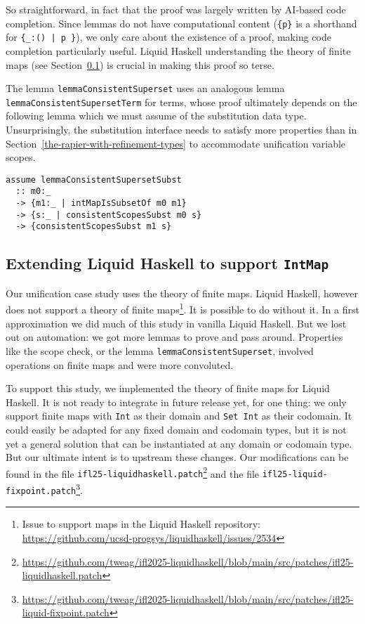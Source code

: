 \documentclass[sigconf]{acmart}
\newcommand{\tc}[1]{{\small\texttt{#1}}}
\newcommand{\patchfile}[1]{\tc{#1}\footnote{\scriptsize\url{https://github.com/tweag/ifl2025-liquidhaskell/blob/main/src/patches/#1}}}
\newtheorem{principle}{Principle}
\begin{document}
So straightforward, in fact that the proof was largely written by AI-based code
completion. Since lemmas do not have computational content (\tc{\{p\}} is a
shorthand for \tc{\{\_:() | p \}}), we only care about the existence of a
proof, making code completion particularly useful. Liquid Haskell understanding
the theory of finite maps (see Section~\ref{extending-liquid-haskell}) is crucial in
making this proof so terse.

The lemma \tc{lemmaConsistentSuperset} uses an analogous lemma \tc{lemma\-Consistent\-Superset\-Term} for terms,
whose proof ultimately depends on the following lemma which we must assume of the substitution data type.
Unsurprisingly, the substitution interface needs to satisfy more properties
than in Section~\ref{the-rapier-with-refinement-types} to accommodate
unification variable scopes.

\begin{verbatim}
assume lemmaConsistentSupersetSubst
  :: m0:_
  -> {m1:_ | intMapIsSubsetOf m0 m1}
  -> {s:_ | consistentScopesSubst m0 s}
  -> {consistentScopesSubst m1 s}
\end{verbatim}

\subsection{Extending Liquid Haskell to support \tc{IntMap}}
\label{extending-liquid-haskell}

Our unification case study uses the theory of finite maps. Liquid Haskell,
however does not support a theory of finite maps\footnote{Issue to support maps in
  the Liquid Haskell repository:
  \url{https://github.com/ucsd-progsys/liquidhaskell/issues/2534}}. It is
possible to do without it. In a first approximation we did much of this study in
vanilla Liquid Haskell. But we lost out on automation: we got more lemmas to prove
and pass around. Properties like the scope check, or the lemma
\tc{lemmaConsistentSuperset}, involved operations on finite maps and were more
convoluted.



To support this study, we implemented the theory of finite maps for Liquid
Haskell. It is not ready to integrate in future release yet, for one thing: we only support finite
maps with \tc{Int} as their domain and \tc{Set Int} as their codomain. It could easily be adapted for any fixed
domain and codomain types, but it is not yet a general solution that can be instantiated at any
domain or codomain type. But our ultimate intent is to upstream these changes. Our
modifications can be found in the file \patchfile{ifl25-liquidhaskell.patch} and the file \patchfile{ifl25-liquid-fixpoint.patch}.
\end{document}
